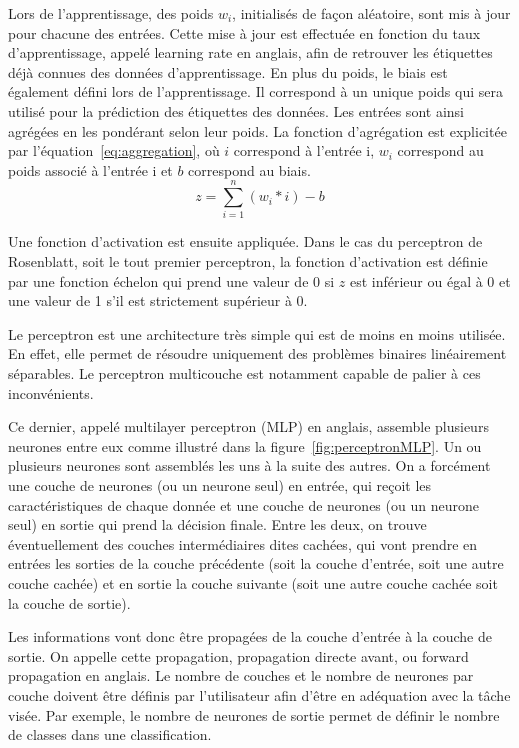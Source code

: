 Lors de l'apprentissage, des poids $w_i$, initialisés de façon aléatoire, sont mis à jour pour chacune des entrées. Cette mise à jour est effectuée en fonction du taux d'apprentissage, appelé learning rate en anglais, afin de retrouver les étiquettes déjà connues des données d'apprentissage. En plus du poids, le biais est également défini lors de l'apprentissage. Il correspond à un unique poids qui sera utilisé pour la prédiction des étiquettes des données. Les entrées sont ainsi agrégées en les pondérant selon leur poids. La fonction d'agrégation est explicitée par l'équation~\ref{eq:aggregation}, où $i$ correspond à l'entrée i, $w_i$ correspond au poids associé à l'entrée i et $b$ correspond au biais.
\begin{equation}
  z = \sum_{i=1}^{n}(w_i*i) - b
  \label{eq:aggregation}
\end{equation}

Une fonction d'activation est ensuite appliquée. Dans le cas du perceptron de Rosenblatt, soit le tout premier perceptron, la fonction d'activation est définie par une fonction échelon qui prend une valeur de 0 si $z$ est inférieur ou égal à 0 et une valeur de 1 s'il est strictement supérieur à 0.

Le perceptron est une architecture très simple qui est de moins en moins utilisée. En effet, elle permet de résoudre uniquement des problèmes binaires linéairement séparables. Le perceptron multicouche est notamment capable de palier à ces inconvénients.


Ce dernier, appelé multilayer perceptron (MLP) en anglais, assemble plusieurs neurones entre eux comme illustré dans la figure~\ref{fig:perceptronMLP}. Un ou plusieurs neurones sont assemblés les uns à la suite des autres. On a forcément une couche de neurones (ou un neurone seul) en entrée, qui reçoit les caractéristiques de chaque donnée et une couche de neurones (ou un neurone seul) en sortie qui prend la décision finale. Entre les deux, on trouve éventuellement des couches intermédiaires dites cachées, qui vont prendre en entrées les sorties de la couche précédente (soit la couche d'entrée, soit une autre couche cachée) et en sortie la couche suivante (soit une autre couche cachée soit la couche de sortie).

Les informations vont donc être propagées de la couche d'entrée à la couche de sortie. On appelle cette propagation, propagation directe avant, ou forward propagation en anglais. Le nombre de couches et le nombre de neurones par couche doivent être définis par l'utilisateur afin d'être en adéquation avec la tâche visée. Par exemple, le nombre de neurones de sortie permet de définir le nombre de classes dans une classification.

